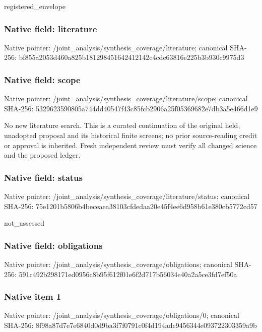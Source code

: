 \documentclass[10pt,a4paper]{article}
\begin{document}
\begingroup\raggedright\sloppy registered\_\allowbreak{}envelope\par\endgroup

\subsubsection{Native field: literature}
Native pointer: /joint\_\allowbreak{}analysis/synthesis\_\allowbreak{}coverage/literature; canonical SHA-256: bf855a2053d460a825b181298451642412142c4cdc63816e225b3b930c9975d3

\subsubsection{Native field: scope}
Native pointer: /joint\_\allowbreak{}analysis/synthesis\_\allowbreak{}coverage/literature/scope; canonical SHA-256: 5329623590805a744dd40547f43c85fcb2906a25f05369682e7db3a5e466d1e9

\begingroup\raggedright\sloppy No new literature search. This is a curated continuation of the original held,\allowbreak{} unadopted proposal and its historical finite screens;\allowbreak{} no prior source-reading credit or approval is inherited. Fresh independent review must verify all changed science and the proposed ledger.\par\endgroup

\subsubsection{Native field: status}
Native pointer: /joint\_\allowbreak{}analysis/synthesis\_\allowbreak{}coverage/literature/status; canonical SHA-256: 75e1201b5806b4beceaea38103cfdedaa20e45f4ee6d958b61e380cb5772cd57

\begingroup\raggedright\sloppy not\_\allowbreak{}assessed\par\endgroup

\subsubsection{Native field: obligations}
Native pointer: /joint\_\allowbreak{}analysis/synthesis\_\allowbreak{}coverage/obligations; canonical SHA-256: 591c492b298171ed0956c8b95f612f01e6f2d717b56034e40a2a5ce3fd7ef50a

\subsubsection{Native item 1}
Native pointer: /joint\_\allowbreak{}analysis/synthesis\_\allowbreak{}coverage/obligations/0; canonical SHA-256: 8f98a87d7e7e6840d0d9ba3f7f0791c0f4d194adc9456344e093722303359a9b
\end{document}
